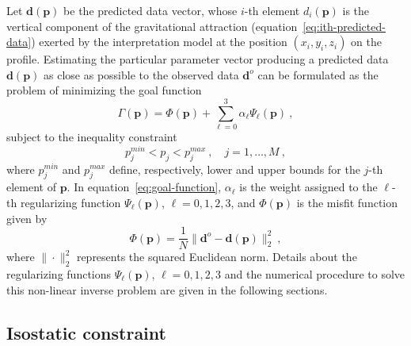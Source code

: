 \documentclass[manuscript]{geophysics}
\begin{document}
Let $\mathbf{d}(\mathbf{p})$ be the predicted data vector, whose $i$-th element
$d_{i}(\mathbf{p})$ is the vertical component of the gravitational attraction
(equation~\ref{eq:ith-predicted-data}) exerted by the interpretation model
at the position $(x_{i}, y_{i}, z_{i})$ on the profile.
Estimating the particular parameter vector producing a predicted data
$\mathbf{d}(\mathbf{p})$ as close as possible to the observed data 
$\mathbf{d}^{o}$ can be formulated as the problem of minimizing the goal function
\begin{equation}
\Gamma (\mathbf{p}) = \Phi(\mathbf{p}) + \sum_{\ell = 0}^{3} \alpha_{\ell}
\Psi_{\ell}(\mathbf{p}) \: ,
\label{eq:goal-function}
\end{equation}
subject to the inequality constraint 
\begin{equation}
p_{j}^{min} < p_{j} < p_{j}^{max} \: , \quad j = 1, \dots, M \: ,
\label{eq:inequality-constraint}
\end{equation}
where $p_{j}^{min}$ and $p_{j}^{max}$ define, respectively, lower and upper bounds 
for the $j$-th element of $\mathbf{p}$.
In equation~\ref{eq:goal-function}, $\alpha_{\ell}$ is the weight assigned to the 
$\ell$-th regularizing function $\Psi_{\ell}(\mathbf{p})$, $\ell = 0, 1, 2, 3$, and
$\Phi(\mathbf{p})$ is the misfit function given by
\begin{equation}
\Phi(\mathbf{p}) = \frac{1}{N} \| \mathbf{d}^{o} - \mathbf{d}(\mathbf{p}) \|_{2}^{2} 
\: , 
\label{eq:misfit-function}
\end{equation}
where $\| \cdot \|_{2}^{2}$ represents the squared Euclidean norm. Details about 
the regularizing functions $\Psi_{\ell}(\mathbf{p})$, $\ell = 0, 1, 2, 3$ and the 
numerical procedure to solve this non-linear inverse problem are given in the following 
sections.


\subsection{Isostatic constraint}
\end{document}
